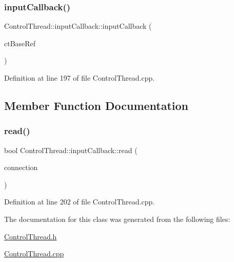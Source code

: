 \subsubsection{\texorpdfstring{input\+Callback()}{inputCallback()}}
{\footnotesize\ttfamily Control\+Thread\+::input\+Callback\+::input\+Callback (\begin{DoxyParamCaption}\item[{\hyperlink{classocra__recipes_1_1ControlThread}{Control\+Thread} \&}]{ct\+Base\+Ref }\end{DoxyParamCaption})}



Definition at line 197 of file Control\+Thread.\+cpp.



\subsection{Member Function Documentation}
\hypertarget{classocra__recipes_1_1ControlThread_1_1inputCallback_a8c41c2ec6a86539d8bc0653fe79e3bec}{}\label{classocra__recipes_1_1ControlThread_1_1inputCallback_a8c41c2ec6a86539d8bc0653fe79e3bec} 
\subsubsection{\texorpdfstring{read()}{read()}}
{\footnotesize\ttfamily bool Control\+Thread\+::input\+Callback\+::read (\begin{DoxyParamCaption}\item[{yarp\+::os\+::\+Connection\+Reader \&}]{connection }\end{DoxyParamCaption})\hspace{0.3cm}{\ttfamily [virtual]}}



Definition at line 202 of file Control\+Thread.\+cpp.



The documentation for this class was generated from the following files\+:\begin{DoxyCompactItemize}
\item 
\hyperlink{ControlThread_8h}{Control\+Thread.\+h}\item 
\hyperlink{ControlThread_8cpp}{Control\+Thread.\+cpp}\end{DoxyCompactItemize}

